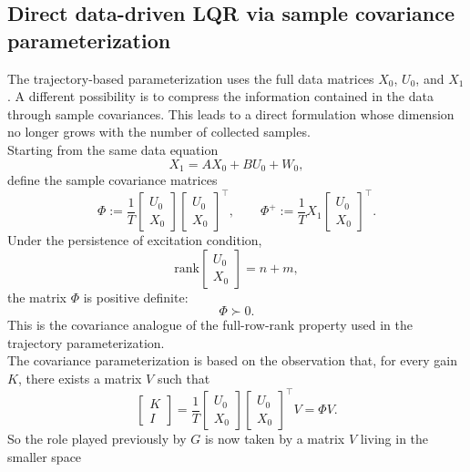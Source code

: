 \subsection{Direct data-driven LQR via sample covariance parameterization}

The trajectory-based parameterization uses the full data matrices $X_0$, $U_0$, and $X_1$.
A different possibility is to compress the information contained in the data through sample
covariances. This leads to a direct formulation whose dimension no longer grows with the
number of collected samples.\\

Starting from the same data equation
\[
X_1 = AX_0 + BU_0 + W_0,
\]
define the sample covariance matrices
\[
\Phi :=
\frac{1}{T}
\begin{bmatrix}
U_0\\[0.3em]
X_0
\end{bmatrix}
\begin{bmatrix}
U_0\\[0.3em]
X_0
\end{bmatrix}^\top,
\qquad
\Phi^+ :=
\frac{1}{T}
X_1
\begin{bmatrix}
U_0\\[0.3em]
X_0
\end{bmatrix}^\top.
\]
Under the persistence of excitation condition,
\[
\text{rank}\!\begin{bmatrix}
U_0\\[0.3em]
X_0
\end{bmatrix}=n+m,
\]
the matrix $\Phi$ is positive definite:
\[
\Phi \succ 0.
\]
This is the covariance analogue of the full-row-rank property used in the trajectory
parameterization.\\
The covariance parameterization is based on the observation that, for every gain $K$, there
exists a matrix $V$ such that
\begin{equation}
\begin{bmatrix}
K\\[0.3em]
I
\end{bmatrix}
=
\frac{1}{T}
\begin{bmatrix}
U_0\\[0.3em]
X_0
\end{bmatrix}
\begin{bmatrix}
U_0\\[0.3em]
X_0
\end{bmatrix}^\top V
=
\Phi V.
\label{eq:cov-param}
\end{equation}
So the role played previously by $G$ is now taken by a matrix $V$ living in the smaller space
